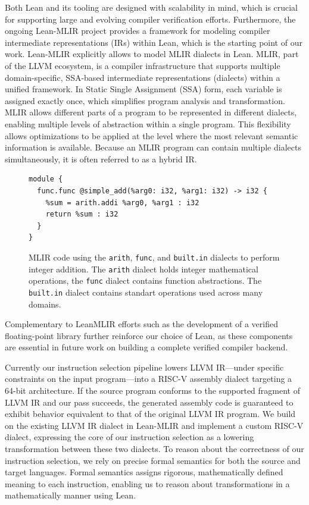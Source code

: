 Both Lean and its tooling are designed with scalability in mind, which is crucial for supporting large and evolving compiler verification efforts. Furthermore, the ongoing Lean-MLIR project provides a framework for modeling compiler intermediate representations (IRs) within Lean, which is the starting point of our work. Lean-MLIR explicitly allows to model MLIR dialects in Lean.
MLIR, part of the LLVM ecosystem, is a compiler infrastructure that supports multiple domain-specific, SSA-based intermediate representations (dialects) within a unified framework. In Static Single Assignment (SSA) form, each variable is assigned exactly once, which simplifies program analysis and transformation. MLIR allows different parts of a program to be represented in different dialects, enabling multiple levels of abstraction within a single program. This flexibility allows optimizations to be applied at the level where the most relevant semantic information is available. Because an MLIR program can contain multiple dialects simultaneously, it is often referred to as a hybrid IR.
\begin{figure}[ht]
\centering
\begin{lstlisting}[language=mlir, basicstyle=\ttfamily\small]
module {
  func.func @simple_add(%arg0: i32, %arg1: i32) -> i32 {
    %sum = arith.addi %arg0, %arg1 : i32
    return %sum : i32
  }
}

\end{lstlisting}
\caption{ MLIR code using the \texttt{arith}, \texttt{func},  and \texttt{built.in} dialects to perform integer addition. The \texttt{arith} dialect holds integer mathematical operations, the \texttt{func} dialect contains function abstractions. The \texttt{built.in} dialect contains standart operations used across many domains.}
\label{fig:mlir-addition}
\end{figure}

Complementary to LeanMLIR efforts such as the development of a verified floating-point library further reinforce our choice of Lean, as these components are essential in future work on building a complete verified compiler backend.

Currently our instruction selection pipeline lowers LLVM IR—under specific constraints on the input program—into a RISC-V assembly dialect targeting a 64-bit architecture. If the source program conforms to the supported fragment of LLVM IR and our pass succeeds, the generated assembly code is guaranteed to exhibit behavior equivalent to that of the original LLVM IR program. We build on the existing LLVM IR dialect in Lean-MLIR and implement a custom RISC-V dialect, expressing the core of our instruction selection as a lowering transformation between these two dialects. To reason about the correctness of our instruction selection, we rely on precise formal semantics for both the source and target languages. Formal semantics assigns rigorous, mathematically defined meaning to each instruction, enabling us to reason about transformations in a mathematically manner using Lean. 


